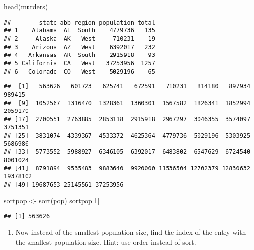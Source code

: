 \documentclass[
]{article}
\newenvironment{Shaded}{\begin{snugshade}}{\end{snugshade}}
\newcommand{\DecValTok}[1]{\textcolor[rgb]{0.00,0.00,0.81}{#1}}
\newcommand{\FunctionTok}[1]{\textcolor[rgb]{0.00,0.00,0.00}{#1}}
\newcommand{\NormalTok}[1]{#1}
\newcommand{\OtherTok}[1]{\textcolor[rgb]{0.56,0.35,0.01}{#1}}
\newcommand{\SpecialCharTok}[1]{\textcolor[rgb]{0.00,0.00,0.00}{#1}}
\providecommand{\tightlist}{%
  \setlength{\itemsep}{0pt}\setlength{\parskip}{0pt}}
\begin{document}
\begin{Shaded}
\begin{Highlighting}[]
\FunctionTok{head}\NormalTok{(murders)}
\end{Highlighting}
\end{Shaded}

\begin{verbatim}
##        state abb region population total
## 1    Alabama  AL  South    4779736   135
## 2     Alaska  AK   West     710231    19
## 3    Arizona  AZ   West    6392017   232
## 4   Arkansas  AR  South    2915918    93
## 5 California  CA   West   37253956  1257
## 6   Colorado  CO   West    5029196    65
\end{verbatim}

\begin{Shaded}
\end{Shaded}

\begin{verbatim}
##  [1]   563626   601723   625741   672591   710231   814180   897934   989415
##  [9]  1052567  1316470  1328361  1360301  1567582  1826341  1852994  2059179
## [17]  2700551  2763885  2853118  2915918  2967297  3046355  3574097  3751351
## [25]  3831074  4339367  4533372  4625364  4779736  5029196  5303925  5686986
## [33]  5773552  5988927  6346105  6392017  6483802  6547629  6724540  8001024
## [41]  8791894  9535483  9883640  9920000 11536504 12702379 12830632 19378102
## [49] 19687653 25145561 37253956
\end{verbatim}

\begin{Shaded}
\begin{Highlighting}[]
\NormalTok{sortpop }\OtherTok{\textless{}{-}} \FunctionTok{sort}\NormalTok{(pop)}
\NormalTok{sortpop[}\DecValTok{1}\NormalTok{]}
\end{Highlighting}
\end{Shaded}

\begin{verbatim}
## [1] 563626
\end{verbatim}

\begin{enumerate}
\def\labelenumi{\arabic{enumi}.}
\setcounter{enumi}{1}
\tightlist
\item
  Now instead of the smallest population size, find the index of the
  entry with the smallest population size. Hint: use order instead of
  sort.
\end{enumerate}
\end{document}
